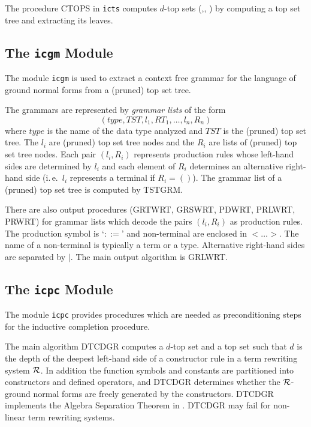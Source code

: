 The procedure  CTOPS in {\tt icts} computes $d$-top sets
(\cite{JouannaudKounalis:89},\cite{BuendgenKuechlin:89},
\cite{BuendgenEckhardt:92}) by computing a top set tree and extracting its 
leaves.

\subsection{The {\tt icgm} Module}

The module {\tt icgm} is used to extract a context free grammar for the 
language of ground normal forms from a (pruned) top set tree.

The grammars are represented by  {\em grammar lists} of the form
\[ (type, TST, l_1, RT_1, \ldots, l_n, R_n) \]
where $type$ is the name of the data type analyzed and $TST$ is the (pruned)
top set tree.
The $l_i$ are (pruned) top set tree nodes and the $R_i$ are lists of (pruned)
top set tree nodes.
Each pair $(l_i, R_i)$ represents production rules whose left-hand sides are
determined by $l_i$ and each element of $R_i$ determines an alternative 
right-hand side (i.\,e.\ $l_i$ represents a terminal if $R_i = ()$).
The grammar list of a (pruned) top set tree is computed by TSTGRM.

There are also output procedures (GRTWRT, GRSWRT, PDWRT, PRLWRT, PRWRT) for
grammar lists which decode the pairs $(l_i, R_i)$ as production rules.
The production symbol is `$::=$' and non-terminal are enclosed in
$< \ldots >$.
The name of a non-terminal is typically a term or a type.
Alternative right-hand sides are separated by $|$.
The main output algorithm is GRLWRT.

\subsection{The {\tt icpc} Module}

The module {\tt icpc} provides procedures which are needed as preconditioning
steps for the inductive completion procedure.

The main algorithm DTCDGR computes a $d$-top set and a top set
such that $d$ is the depth of 
the deepest left-hand side of a constructor rule in a term rewriting system
$\cal R$.
In addition the function symbols and constants are partitioned into
constructors and defined operators, and DTCDGR determines whether the 
$\cal R$-ground normal forms are freely generated by the constructors.
DTCDGR implements the Algebra Separation Theorem in \cite{BuendgenKuechlin:89}.
DTCDGR may fail for non-linear term rewriting systems.

